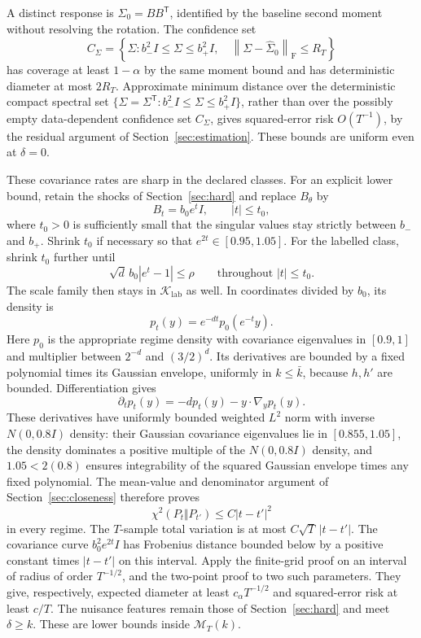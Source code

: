 \documentclass[11pt,a4paper]{article}
\numberwithin{equation}{section}
\newcommand{\cM}{\mathcal M}
\newcommand{\T}{\mathsf T}
\newcommand{\F}{\mathrm F}
\newcommand{\norm}[1]{\left\lVert #1\right\rVert}
\begin{document}
A distinct response is \(\Sigma_0=BB^\T\), identified by the baseline
second moment without resolving the rotation.
The confidence set
\[
 C_\Sigma=\left\{\Sigma:
     b_-^2I\le\Sigma\le b_+^2I,\quad
     \norm{\Sigma-\widehat\Sigma_0}_{\F}\le R_T\right\}
\]
has coverage at least \(1-\alpha\) by the same moment bound and has
deterministic diameter at most \(2R_T\).
Approximate minimum distance over the deterministic compact spectral set
\(\{\Sigma=\Sigma^\T:b_-^2I\le\Sigma\le b_+^2I\}\), rather than over the
possibly empty data-dependent confidence set \(C_\Sigma\), gives
squared-error risk \(O(T^{-1})\), by the residual argument of
Section~\ref{sec:estimation}.
These bounds are uniform even at \(\delta=0\).

These covariance rates are sharp in the declared classes.
For an explicit lower bound, retain the shocks of Section~\ref{sec:hard}
and replace \(B_\theta\) by
\[
 B_t=b_0e^tI,\qquad |t|\le t_0,
\]
where \(t_0>0\) is sufficiently small that the singular values stay
strictly between \(b_-\) and \(b_+\).
Shrink \(t_0\) if necessary so that \(e^{2t}\in[0.95,1.05]\).
For the labelled class, shrink \(t_0\) further until
\[
 \sqrt d\,b_0|e^t-1|\le\rho\qquad\text{throughout }|t|\le t_0.
\]
The scale family then stays in \(\mathcal K_{\mathrm{lab}}\) as well.
In coordinates divided by \(b_0\), its density is
\[
 p_t(y)=e^{-dt}p_0(e^{-t}y).
\]
Here \(p_0\) is the appropriate regime density with covariance
eigenvalues in \([0.9,1]\) and multiplier between \(2^{-d}\) and
\((3/2)^d\).
Its derivatives are bounded by a fixed polynomial times its Gaussian
envelope, uniformly in \(k\le\bar k\), because \(h,h'\) are bounded.
Differentiation gives
\[
 \partial_t p_t(y)=-dp_t(y)-y\mathbin{\cdot}\nabla_y p_t(y).
\]
These derivatives have uniformly bounded weighted \(L^2\) norm with
inverse \(N(0,0.8I)\) density: their Gaussian covariance eigenvalues lie
in \([0.855,1.05]\), the density dominates a positive multiple of
the \(N(0,0.8I)\) density, and \(1.05<2(0.8)\) ensures integrability
of the squared Gaussian envelope times any fixed polynomial.
The mean-value and denominator argument of Section~\ref{sec:closeness}
therefore proves
\[
 \chi^2(P_t\Vert P_{t'})\le C|t-t'|^2
\]
in every regime. The \(T\)-sample total variation is at most
\(C\sqrt T\,|t-t'|\).
The covariance curve \(b_0^2e^{2t}I\) has Frobenius distance bounded
below by a positive constant times \(|t-t'|\) on this interval.
Apply the finite-grid proof on an interval of radius of order
\(T^{-1/2}\), and the two-point proof to two such parameters.
They give, respectively, expected diameter at least
\(c_\alpha T^{-1/2}\) and squared-error risk at least \(c/T\).
The nuisance features remain those of Section~\ref{sec:hard} and meet
\(\delta\ge k\). These are lower bounds inside \(\cM_T(k)\).
\end{document}
